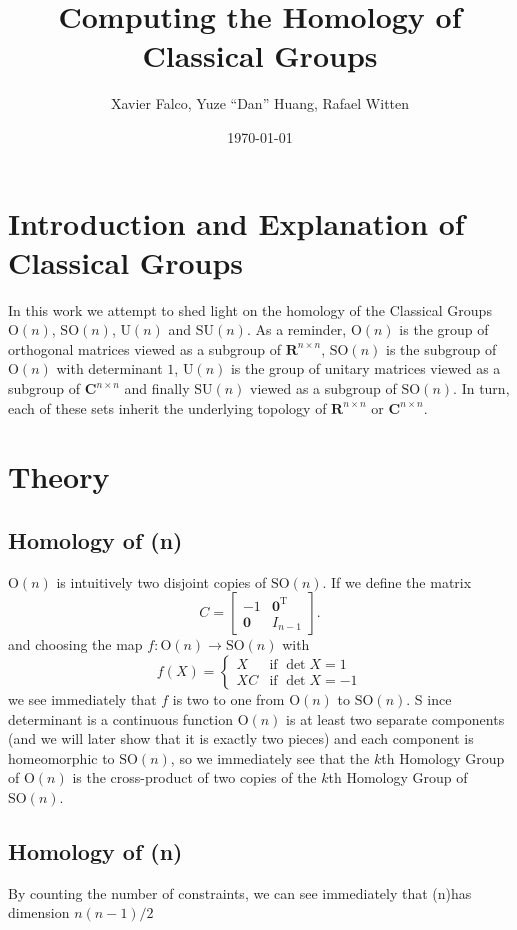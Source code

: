 \documentclass[letterpaper,11pt]{article}
\title{Computing the Homology of Classical Groups}
\author{Xavier Falco, Yuze ``Dan'' Huang, Rafael Witten}
\date{\today}
\newcommand{\Tr}{^\text{T}}
\newcommand{\zeros}{\mathbf{0}}
\newcommand{\reals}{\mathbf{R}}
\newcommand{\complexes}{\mathbf{C}}
\newcommand{\MG}[2]{{\text{#1}(#2)}}
\newcommand{\Un}{\MG{U}{n}}
\newcommand{\On}{\MG{O}{n}}
\newcommand{\SUn}{\MG{SU}{n}}
\newcommand{\SOn}{\MG{SO}{n}}
\begin{document}
\maketitle
\thispagestyle{empty}
\section{Introduction and Explanation of Classical Groups}

In this work we attempt to shed light on the homology of the Classical Groups $\On$, $\SOn$, $\Un$ and $\SUn$. As a reminder, $\On$ is the group of orthogonal matrices viewed as a subgroup of $\reals^{n \times n}$, $\SOn$ is the subgroup of $\On$ with determinant $1$, $\Un$ is the group of unitary matrices viewed as a subgroup of $\complexes^{n\times n}$ and finally $\SUn$ viewed as a subgroup of $\SOn$. In turn, each of these sets inherit the underlying topology of $\reals^{n \times n}$ or $\complexes^{n \times n}$.

\section{Theory}

\subsection{Homology of \On}

$\On$ is intuitively two disjoint copies of $\SOn$. If we define the matrix
\[
  C = \begin{bmatrix}-1 & \zeros\Tr\\ \zeros & I_{n-1} \end{bmatrix}.
\]
and choosing the map $f:\On\to\SOn$ with
\[
  f(X) = \left\{
\begin{array}{ll}
  X & \mbox{if }\det{X} = 1\\
 XC & \mbox{if }\det{X} = -1
\end{array}\right.
\]
we see immediately that $f$ is two to one from $\On$ to $\SOn$. S ince determinant is a continuous function $\On$ is at least two separate components (and we will later show that it is exactly two pieces) and each component is homeomorphic to $\SOn$, so we immediately see that the $k$th Homology Group of $\On$ is the cross-product of two copies of the $k$th Homology Group of $\SOn$.

\subsection{Homology of \SOn}
By counting the number of constraints, we can see immediately that \SOn has dimension $n(n-1)/2$
\end{document}
